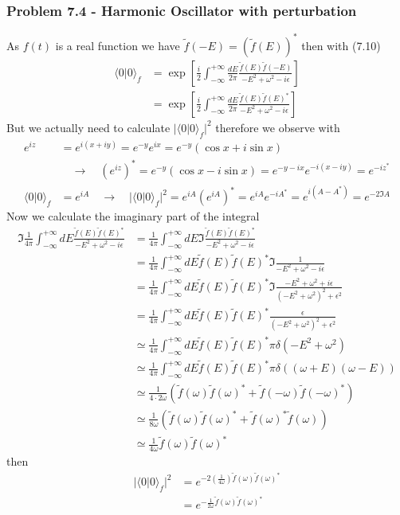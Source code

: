 \documentclass[10pt,a4paper]{book}
\theoremstyle{definition}
\begin{document}
\subsubsection{Problem 7.4 - Harmonic Oscillator with perturbation}
As $f(t)$ is a real function we have $\tilde f(-E)=(\tilde f(E))^*$ then with (7.10)
\begin{align}
\langle0|0\rangle_f
&=\exp\left[\frac{i}{2}\int_{-\infty}^{+\infty}\frac{dE}{2\pi}\frac{\tilde f(E)\tilde f(-E)}{-E^2+\omega^2-i\epsilon}\right]\\
&=\exp\left[\frac{i}{2}\int_{-\infty}^{+\infty}\frac{dE}{2\pi}\frac{\tilde f(E)\tilde f(E)^*}{-E^2+\omega^2-i\epsilon}\right]
\end{align}
But we actually need to calculate $|\langle0|0\rangle_f|^2$ therefore we observe with
\begin{align}
e^{iz}&=e^{i(x+iy)}=e^{-y}e^{ix}=e^{-y}(\cos x+i\sin x)\\
&\quad\rightarrow\quad (e^{iz})^*=e^{-y}(\cos x-i\sin x)=e^{-y-ix}e^{-i(x-iy)}=e^{-iz^*}\\
\langle0|0\rangle_f&=e^{iA}\quad\rightarrow\quad|\langle0|0\rangle_f|^2=e^{iA}(e^{iA})^*=e^{iA}e^{-iA^*}=e^{i(A-A^*)}=e^{-2\Im A}
\end{align}
Now we calculate the imaginary part of the integral
\begin{align}
\Im\frac{1}{4\pi}\int_{-\infty}^{+\infty}dE\frac{\tilde f(E)\tilde f(E)^*}{-E^2+\omega^2-i\epsilon}
&=\frac{1}{4\pi}\int_{-\infty}^{+\infty}dE\Im\frac{\tilde f(E)\tilde f(E)^*}{-E^2+\omega^2-i\epsilon}\\
&=\frac{1}{4\pi}\int_{-\infty}^{+\infty}dE\tilde f(E)\tilde f(E)^*\Im\frac{1}{-E^2+\omega^2-i\epsilon}\\
&=\frac{1}{4\pi}\int_{-\infty}^{+\infty}dE\tilde f(E)\tilde f(E)^*\Im\frac{-E^2+\omega^2+i\epsilon}{(-E^2+\omega^2)^2+\epsilon^2}\\
&=\frac{1}{4\pi}\int_{-\infty}^{+\infty}dE\tilde f(E)\tilde f(E)^*\frac{\epsilon}{(-E^2+\omega^2)^2+\epsilon^2}\\
&\simeq\frac{1}{4\pi}\int_{-\infty}^{+\infty}dE\tilde f(E)\tilde f(E)^*\pi\delta(-E^2+\omega^2)\\
&\simeq\frac{1}{4\pi}\int_{-\infty}^{+\infty}dE\tilde f(E)\tilde f(E)^*\pi\delta((\omega+E)(\omega-E))\\
&\simeq\frac{1}{4\cdot 2\omega}(\tilde f(\omega)\tilde f(\omega)^*+\tilde f(-\omega)\tilde f(-\omega)^*)\\
&\simeq\frac{1}{8\omega}(\tilde f(\omega)\tilde f(\omega)^*+\tilde f(\omega)^*\tilde f(\omega))\\
&\simeq\frac{1}{4\omega}\tilde f(\omega)\tilde f(\omega)^*
\end{align}
then
\begin{align}
|\langle0|0\rangle_f|^2
&=e^{-2\left(\frac{1}{4\omega}\right)\tilde f(\omega)\tilde f(\omega)^*}\\
&=e^{-\frac{1}{2\omega}\tilde f(\omega)\tilde f(\omega)^*}\\
\end{align}
\end{document}
